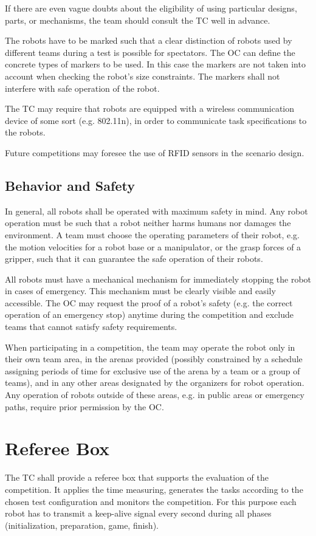 \par
If there are even vague doubts about the eligibility of using particular designs, parts, or mechanisms, the team should consult the TC well in advance.
\par
The robots have to be marked such that a clear distinction of robots used by different teams during a test is possible for spectators. The OC can define the concrete types of markers to be used. In this case the markers are not taken into account when checking the robot's size constraints. The markers shall not interfere with safe operation of the robot.
\par
The TC may require that robots are equipped with a wireless communication device of some sort (e.g. 802.11n), in order to communicate task specifications to the robots.
\par
Future competitions may foresee the use of RFID sensors in the scenario design.

\subsection{Behavior and Safety} \label{ssec:RobotBehaviorAndSafety}
In general, all robots shall be operated with maximum safety in mind. Any robot operation must be such that a robot neither harms humans nor damages the environment. A team must choose the operating parameters of their robot, e.g. the motion velocities for a robot base or a manipulator, or the grasp forces of a gripper, such that it can guarantee the safe operation of their robots.
\par
All robots must have a mechanical mechanism for immediately stopping the robot in cases of emergency. This mechanism must be clearly visible and easily accessible. The OC may request the proof of a robot's safety (e.g. the correct operation of an emergency stop) anytime during the competition and exclude teams that cannot satisfy safety requirements.
\par
When participating in a competition, the team may operate the robot only in their own team area, in the arenas provided (possibly constrained by a schedule assigning periods of time for exclusive use of the arena by a team or a group of teams), and in any other areas designated by the organizers for robot operation. Any operation of robots outside of these areas, e.g. in public areas or emergency paths, require prior permission by the OC.

\section{Referee Box}
The TC shall provide a referee box that supports the evaluation of the competition. It applies the time measuring, generates the tasks according to the chosen test configuration and monitors the
competition. For this purpose each robot has to transmit a keep-alive signal every second during all phases (initialization, preparation, game, finish). 

